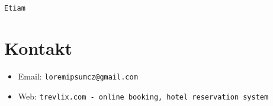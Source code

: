\documentclass[a4paper, 12pt]{article}
\begin{document}
\begin{verbatim}

Etiam

\end{verbatim}

\section*{Kontakt}
\begin{itemize}
    \item Email: \texttt{loremipsumcz@gmail.com}
    \item Web: \texttt{trevlix.com - online booking, hotel reservation system}
\end{itemize}
\end{document}
